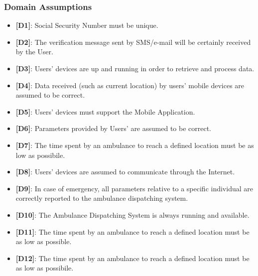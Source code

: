 \documentclass[12pt,a4paper]{article}
\begin{document}
	\subsubsection{Domain Assumptions}
	\begin{itemize} 
		\item {\textbf[}\textbf{D1}{\textbf]}: Social Security Number must be unique.
		\item {\textbf[}\textbf{D2}{\textbf]}: The verification message sent by SMS/e-mail will be certainly received by the User.
		\item {\textbf[}\textbf{D3}{\textbf]}: Users' devices are up and running in order to retrieve and process data. 
		\item {\textbf[}\textbf{D4}{\textbf]}: Data received (such as current location) by users' mobile devices are assumed to be correct.
		\item {\textbf[}\textbf{D5}{\textbf]}: Users' devices must support the Mobile Application.
		\item {\textbf[}\textbf{D6}{\textbf]}: Parameters provided by Users' are assumed to be correct.
		\item {\textbf[}\textbf{D7}{\textbf]}: The time spent by an ambulance to reach a defined location must be as low as possibile.
		\item {\textbf[}\textbf{D8}{\textbf]}: Users' devices are assumed to communicate through the Internet.
		\item {\textbf[}\textbf{D9}{\textbf]}: In case of emergency, all parameters relative to a specific individual are correctly reported to the ambulance dispatching system.
		\item {\textbf[}\textbf{D10}{\textbf]}: The Ambulance Dispatching System is always running and available.
		\item {\textbf[}\textbf{D11}{\textbf]}: The time spent by an ambulance to reach a defined location must be as low as possible.
		\item {\textbf[}\textbf{D12}{\textbf]}: The time spent by an ambulance to reach a defined location must be as low as possibile.
	\end{itemize}
\end{document}
